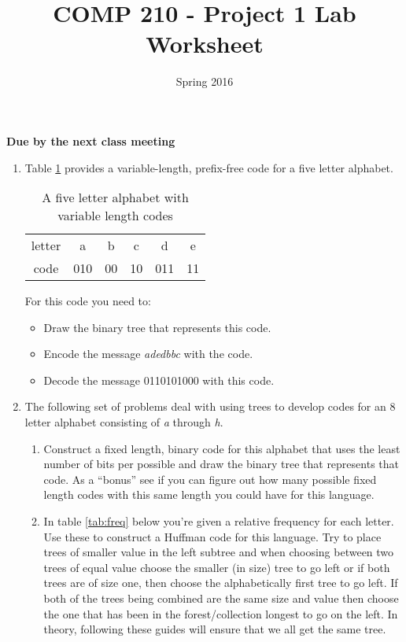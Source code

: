 \documentclass[]{article}
\title{COMP 210 - Project 1 Lab Worksheet}
\author{}
\date{Spring 2016}
\begin{document}
\maketitle
\thispagestyle{empty}

\begin{center}
\textbf{Due by the next class meeting}
\end{center}

\begin{enumerate}

\item Table \ref{tab:code} provides a variable-length, prefix-free code for a five letter alphabet. 
\begin{table}[!htpb]
\begin{center}
\begin{tabular}{cccccc}
letter    & a & b & c & d &  e \\
code & 010 &  00 & 10 &  011 & 11
\end{tabular}
\end{center}
\caption{A five letter alphabet with variable length codes}
\label{tab:code}
\end{table}

For this code you need to:
\begin{itemize}
\item Draw the binary tree that represents this code. 
\item Encode the message \textit{adedbbc} with the code. 
\item Decode the message 0110101000 with this code. 
\end{itemize}
\newpage \thispagestyle{empty}
\mbox{}
\newpage \thispagestyle{empty}

\item The following set of problems deal with using trees to develop codes for an 8 letter alphabet consisting of \textit{a} through \textit{h}.
\begin{enumerate}
\item Construct a fixed length, binary code for this alphabet that uses the least number of bits per possible and draw the binary tree that represents that code. As a ``bonus'' see if you can figure out how many possible fixed length codes with this same length you could have for this language.
\newpage \thispagestyle{empty}

\item In table \ref{tab:freq} below you're given a relative frequency for each letter. Use these to construct a Huffman code for this language. Try to place trees of smaller value in the left subtree and when choosing between two trees of equal value choose the smaller (in size) tree to go left or if both trees are of size one, then choose the alphabetically first tree to go left. If both of the trees being combined are the same size and value then choose the one that has been in the forest/collection longest to go on the left. In theory, following these guides will ensure that we all get the same tree. 


\end{enumerate}
\end{enumerate}
\end{document}
